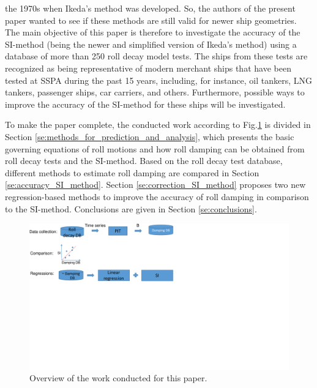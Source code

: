 the 1970s when Ikeda’s method was developed. So, the authors of the present paper wanted to see if these methods are still valid for newer ship geometries. The main objective of this paper is therefore to investigate the accuracy of the SI-method (being the newer and simplified version of Ikeda’s method) using a database of more than 250 roll decay model tests. The ships from these tests are recognized as being representative of modern merchant ships that have been tested at SSPA during the past 15 years, including, for instance, oil tankers, LNG tankers, passenger ships, car carriers, and others. Furthermore, possible ways to improve the accuracy of the SI-method for these ships will be investigated.

To make the paper complete, the conducted work according to Fig.\ref{fig:workflow} is divided in Section \ref{se:methods_for_prediction_and_analysis}, which presents the basic governing equations of roll motions and how roll damping can be obtained from roll decay tests and the SI-method. Based on the roll decay test database, different methods to estimate roll damping are compared in Section \ref{se:accuracy_SI_method}. Section \ref{se:correction_SI_method} proposes two new regression-based methods to improve the accuracy of roll damping in comparison to the SI-method. Conclusions are given in Section \ref{se:conclusions}.
 

\begin{figure}[H]
    \centering
    \includegraphics[width=0.5\columnwidth]{figures/workflow.pdf}
    \caption{Overview of the work conducted for this paper.}
    \label{fig:workflow}
\end{figure}